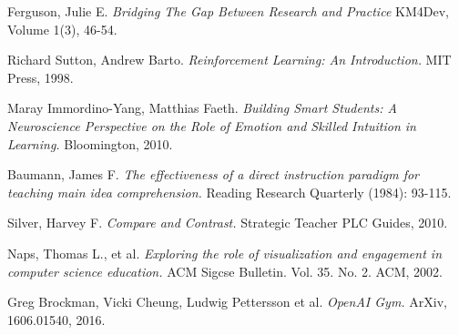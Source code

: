 \documentclass[11pt]{article} %
\begin{document}
\medskip
 
\begin{thebibliography}{9}

  Ferguson, Julie E.
  \textit{Bridging The Gap Between Research and Practice}
  KM4Dev, Volume 1(3), 46-54.
 
  Richard Sutton, Andrew Barto.
  \textit{Reinforcement Learning: An Introduction.}
  MIT Press, 1998.
 
  Maray Immordino-Yang, Matthias Faeth.
  \textit{Building Smart Students: A Neuroscience Perspective on the Role
    of Emotion and Skilled Intuition in Learning.}
  Bloomington, 2010.
 
  Baumann, James F.
  \textit{The effectiveness of a direct instruction paradigm for teaching main idea comprehension.}
  Reading Research Quarterly (1984): 93-115.
 
  Silver, Harvey F.
  \textit{Compare and Contrast.}
  Strategic Teacher PLC Guides, 2010.
 
  Naps, Thomas L., et al.
  \textit{Exploring the role of visualization and engagement in computer science education.}
  ACM Sigcse Bulletin. Vol. 35. No. 2. ACM, 2002.
 
  Greg Brockman, Vicki Cheung, Ludwig Pettersson et al.
  \textit{OpenAI Gym.}
  ArXiv, 1606.01540, 2016.
 
\end{thebibliography}
\end{document}
